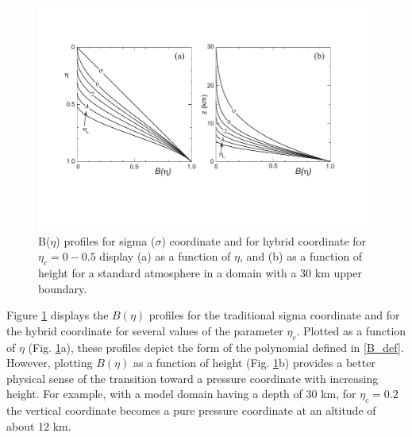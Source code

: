 \begin{figure}
\centerline{\includegraphics[width=38pc]{figures/B_profile.pdf}}
\caption{\label{figure:B_profile}B($\eta$) profiles for sigma ($\sigma$) coordinate and for hybrid coordinate for $\eta_c=0-0.5$ display (a) as a function of $\eta$, and (b) as a function of height for a standard atmosphere in a domain with a 30 km upper boundary.}
\end{figure}

Figure \ref{figure:B_profile} displays the $B(\eta)$ profiles for the traditional sigma coordinate and for the hybrid coordinate for several values of the parameter $\eta_c$. Plotted as a function of $\eta$ (Fig. \ref{figure:B_profile}a), these profiles depict the form of the polynomial defined in \eqref{B_def}. However, plotting $B(\eta)$ as a function of height  (Fig. \ref{figure:B_profile}b) provides a better physical sense of the transition toward a pressure coordinate with increasing height. For example, with a model domain having a depth of 30 km, for $\eta_c=0.2$ the vertical coordinate becomes a pure pressure coordinate at an altitude of about 12 km.

